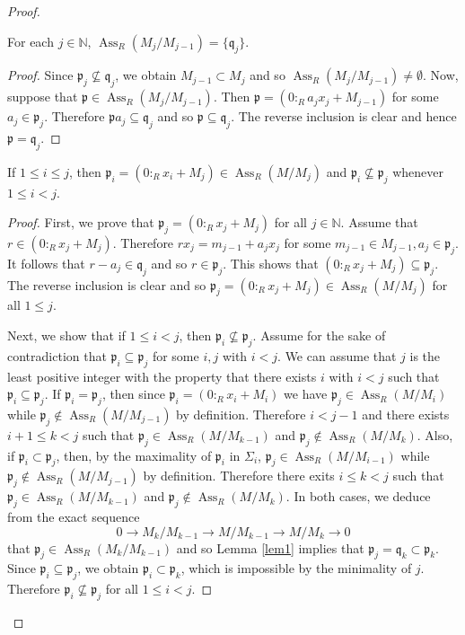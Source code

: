 \documentclass[10pt,a4paper]{amsart}
\newcommand\N{\mathbb N}
\newcommand\ass {\operatorname{Ass}}
\newcommand\fp{\mathfrak p}
\newcommand\fq{\mathfrak q}
\begin{document}
\begin{proof}
  \begin{lem}\label{lem1} For each $ j\in \N$, $\ass_R(M_j/M_{j-1})=\{\fq_j\}$.
  \end{lem}
  \begin{proof}
  Since $\fp_j\nsubseteq\fq_j$, we obtain $M_{j-1}\subset M_j$ and so $\ass_R(M_j/M_{j-1})\neq\emptyset$. Now, suppose that  $\fp\in\ass_R(M_j/M_{j-1})$. Then $\fp=(0:_Ra_jx_j+M_{j-1})$ for some $a_j\in\fp_j$. Therefore
   $\fp a_j\subseteq\fq_j$ and so $\fp\subseteq \fq_j$. The reverse inclusion is clear and hence  $\fp=\fq_j$.
  \end{proof}

  \begin{lem} If  $1\leq i\leq j$, then $\fp_i=(0:_Rx_i+M_j)\in\ass_R(M/M_j)$ and $\fp_i\nsubseteq\fp_j$ whenever $1\leq i<j$.
  \end{lem}
  \begin{proof}
  First, we prove that $\fp_j=(0:_Rx_j+M_j)$ for all $j\in\N$. Assume that $r\in(0:_Rx_j+M_j)$. Therefore $rx_j=m_{j-1}+a_jx_j$ for some $m_{j-1}\in M_{j-1},a_j\in\fp_j$. It follows that $r-a_j\in\fq_j$ and so $r\in\fp_j$. This shows that $(0:_Rx_j+M_j)\subseteq\fp_j$. The reverse inclusion is clear and so $\fp_j=(0:_Rx_j+M_j)\in\ass_R(M/M_j)$ for all $1\leq j$.

  Next, we show that    if $1\leq i<j$, then $\fp_i\nsubseteq\fp_j$. Assume for the sake of contradiction that $\fp_i\subseteq\fp_j$ for some $i, j$ with $i<j$. We can assume that $j$ is the least positive integer with the property  that there exists $i$ with $i<j$ such that $\fp_i\subseteq\fp_j$. If $\fp_i=\fp_j$, then since $\fp_i=(0:_Rx_i+M_i)$ we have $\fp_j\in\ass_R(M/M_i)$ while $\fp_j\notin\ass_R(M/M_{j-1})$ by definition. Therefore $i<j-1$ and  there exists $i+1\leq k< j$ such that $\fp_j\in\ass_R(M/M_{k-1})$ and $\fp_j\notin\ass_R(M/M_{k})$. Also, if $\fp_i\subset \fp_j$,  then, by the maximality of $\fp_i$ in $\Sigma_i$,  $\fp_j\in\ass_R(M/M_{i-1})$ while  $\fp_j \notin\ass_R(M/M_{j-1})$ by definition. Therefore there exits $i\leq k <j$ such that $\fp_j\in\ass_R(M/M_{k-1})$ and $\fp_j\notin\ass_R(M/M_k)$. In both cases,
  we deduce from the exact sequence
 $$0\rightarrow M_k/M_{k-1}\rightarrow M/M_{k-1}\rightarrow M/M_k\rightarrow 0$$
 that $\fp_j\in\ass_R(M_k/M_{k-1})$ and so Lemma \ref{lem1} implies that $\fp_j=\fq_k\subset\fp_k$. Since $\fp_i\subseteq\fp_j$, we obtain $\fp_i\subset\fp_k$, which is impossible by the minimality of $j$. Therefore $\fp_i\nsubseteq\fp_j$ for all $1\leq i<j$.


\end{proof}
\end{proof}
\end{document}
